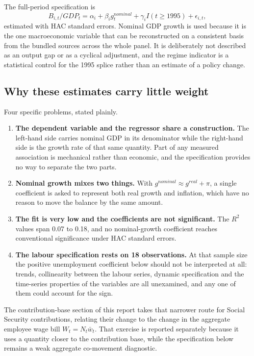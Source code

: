 \documentclass[11pt,a4paper]{article}
\begin{document}
The full-period specification is
\[
B_{i,t}/GDP_t = \alpha_i + \beta_i g^{nominal}_t + \gamma_i I(t \ge 1995) +
\epsilon_{i,t},
\]
estimated with HAC standard errors. Nominal GDP growth is used because it is the one
macroeconomic variable that can be reconstructed on a consistent basis from the bundled
sources across the whole panel. It is deliberately not described as an output gap or as a
cyclical adjustment, and the regime indicator is a statistical control for the 1995
splice rather than an estimate of a policy change.

\subsection{Why these estimates carry little weight}

Four specific problems, stated plainly.

\begin{enumerate}
\item \textbf{The dependent variable and the regressor share a construction.} The left-hand
side carries nominal GDP in its denominator while the right-hand side is the growth rate of
that same quantity. Part of any measured association is mechanical rather than economic, and
the specification provides no way to separate the two parts.
\item \textbf{Nominal growth mixes two things.} With
\(g^{nominal} \approx g^{real} + \pi\), a single coefficient is asked to represent both
real growth and inflation, which have no reason to move the balance by the same amount.
\item \textbf{The fit is very low and the coefficients are not significant.} The
\(R^2\) values span 0.07 to 0.18, and no nominal-growth coefficient reaches
conventional significance under HAC standard errors.
\item \textbf{The labour specification rests on 18 observations.} At that sample
size the positive unemployment coefficient below should not be interpreted at all: trends,
collinearity between the labour series, dynamic specification and the time-series properties
of the variables are all unexamined, and any one of them could account for the sign.
\end{enumerate}

The contribution-base section of this report takes that narrower route for Social
Security contributions, relating their change to the change in the aggregate employee wage
bill \(W_t = N_t \bar{w}_t\). That exercise is reported separately because it uses a
quantity closer to the contribution base, while the specification below remains a weak
aggregate co-movement diagnostic.
\end{document}
